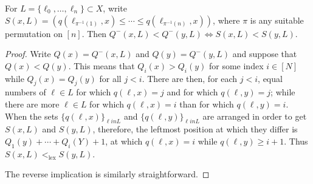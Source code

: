\documentclass[
]{article}
\begin{document}
\begin{lemma}\label{lem:revlex-lex}
For $L = \{ \ell_0, \ldots, \ell_n \} \subset X$, write $S(x,L) = ( q(\ell_{\pi^{-1}(1)},x) \leq \cdots \leq q(\ell_{\pi^{-1}(n)},x) )$, where $\pi$ is any suitable permutation on $[n]$.
Then $Q^-(x,L) < Q^-(y,L) \Leftrightarrow S(x,L) < S(y,L)$.
\end{lemma}

\begin{proof}
Write $Q(x) = Q^-(x,L)$ and $Q(y) = Q^-(y,L)$ and suppose that $Q(x) < Q(y)$.
This means that $Q_i(x) > Q_i(y)$ for some index $i \in [N]$ while $Q_j(x) = Q_j(y)$ for all $j < i$.
There are then, for each $j < i$, equal numbers of $\ell \in L$ for which $q(\ell,x) = j$ and for which $q(\ell,y) = j$; while there are more $\ell \in L$ for which $q(\ell,x) = i$ than for which $q(\ell,y) = i$.
When the sets $\{ q(\ell,x) \}_{\ell in L}$ and $\{ q(\ell,y) \}_{\ell in L}$ are arranged in order to get $S(x,L)$ and $S(y,L)$, therefore, the leftmost position at which they differ is $Q_1(y) + \cdots + Q_i(Y) + 1$, at which $q(\ell,x) = i$ while $q(\ell,y) \geq i + 1$.
Thus $S(x,L) <_{\operatorname{lex}} S(y,L)$.

The reverse implication is similarly straightforward.
\end{proof}
\end{document}

